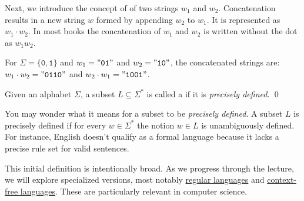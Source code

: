 Next, we introduce the concept of   of two strings \( w_1 \) and
\(w_2 \). Concatenation results in a new string \( w \) formed by appending \( w_2 \) to \( w_1 \). It is
represented as \( w_1 \cdot w_2 \).  In most books the concatenation of $w_1$ and $w_2$ is written without the
dot as \( w_1w_2 \). 

\vspace*{0.3cm}

\exampleEng
For \( \Sigma = \{\mathtt{0}, \mathtt{1}\} \) and \( w_1 = \mathtt{"01"} \) and \( w_2 = \mathtt{"10"} \), the concatenated strings are:
\\[0.2cm]
\hspace*{1.3cm}
\( w_1 \cdot w_2 = \mathtt{"0110"} \) and \( w_2 \cdot w_1 = \mathtt{"1001"} \). \eox

\begin{Definition} \hspace*{\fill} \linebreak
Given an alphabet \( \Sigma \), a subset \( L \subseteq \Sigma^* \) is called a  if it is
\emph{precisely defined}.  \qed 
\end{Definition}

You may wonder what it means for a subset to be \emph{precisely defined}.  A subset $L$ is precisely defined if
for every $w \in \Sigma^*$ the notion $w \in L$ is unambiguously defined.  For instance, English doesn't
qualify as a formal language because it lacks a precise rule set for valid sentences. 

This initial definition is intentionally broad. As we progress through the lecture, we will explore specialized
versions, most notably \href{http://en.wikipedia.org/wiki/Regular_language}{regular languages}
 and \href{http://en.wikipedia.org/wiki/Context-free_language}{context-free
  languages}.  These are particularly relevant in computer science. 

